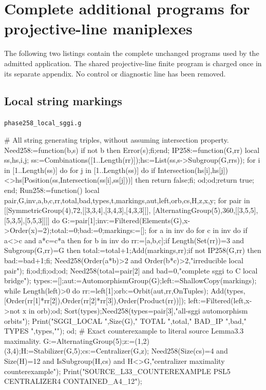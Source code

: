 \documentclass[11pt,a4paper]{article}
\begin{document}
\section*{Complete additional programs for projective-line maniplexes}
The following two listings contain the complete unchanged programs used by
the admitted application. The shared projective-line finite program is charged
once in its separate appendix. No control or diagnostic line has been removed.
\subsection*{Local string markings}
\noindent\texttt{phase258\_local\_sggi.g}
\begin{CompleteProgram}
# All string generating triples, without assuming intersection property.
Need258:=function(b,s) if not b then Error(s);fi;end;
IP258:=function(G,rr)
 local ss,hs,i,j;
 ss:=Combinations([1..Length(rr)]);hs:=List(ss,s->Subgroup(G,rr{s}));
 for i in [1..Length(ss)] do for j in [1..Length(ss)] do
 if Intersection(hs[i],hs[j])<>hs[Position(ss,Intersection(ss[i],ss[j]))] then return false;fi;
 od;od;return true;
end;
Run258:=function()
 local pair,G,inv,a,b,c,rr,total,bad,types,t,markings,aut,left,orb,cs,H,z,x,y;
 for pair in [[SymmetricGroup(4),72,[[3,3,4],[3,4,3],[4,3,3]]],
              [AlternatingGroup(5),360,[[3,5,5],[5,3,5],[5,5,3]]]] do
 G:=pair[1];inv:=Filtered(Elements(G),x->Order(x)=2);total:=0;bad:=0;markings:=[];
 for a in inv do for c in inv do if a<>c and a*c=c*a then for b in inv do
 rr:=[a,b,c];if Length(Set(rr))=3 and Subgroup(G,rr)=G then
 total:=total+1;Add(markings,rr);if not IP258(G,rr) then bad:=bad+1;fi;
 Need258(Order(a*b)>2 and Order(b*c)>2,"irreducible local pair");
 fi;od;fi;od;od;
 Need258(total=pair[2] and bad=0,"complete sggi to C local bridge");
 types:=[];aut:=AutomorphismGroup(G);left:=ShallowCopy(markings);
 while Length(left)>0 do rr:=left[1];orb:=Orbit(aut,rr,OnTuples);
 Add(types,[Order(rr[1]*rr[2]),Order(rr[2]*rr[3]),Order(Product(rr))]);
 left:=Filtered(left,x->not x in orb);od;
 Sort(types);Need258(types=pair[3],"all-sggi automorphism orbits");
 Print("SGGI_LOCAL ",Size(G)," TOTAL ",total," BAD_IP ",bad," TYPES ",types,"\n");
 od;
 # Exact counterexample to literal source Lemma3.3 maximality.
 G:=AlternatingGroup(5);z:=(1,2)(3,4);H:=Stabilizer(G,5);cs:=Centralizer(G,z);
 Need258(Size(cs)=4 and Size(H)=12 and IsSubgroup(H,cs) and H<>G,"centralizer maximality counterexample");
 Print("SOURCE_L33_COUNTEREXAMPLE PSL5 CENTRALIZER4 CONTAINED_A4_12\n");

\end{CompleteProgram}
\end{document}

